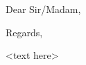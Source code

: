 


\recipient{~}{~}
\date{\today}
\opening{Dear Sir/Madam,}
\closing{Regards,}



\makelettertitle

<text here>

\makeletterclosing



